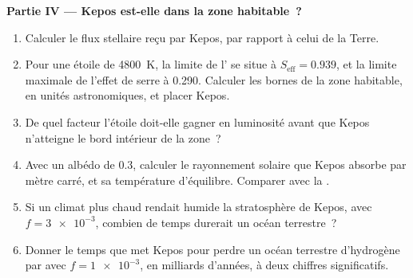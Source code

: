 \begin{problem}
\medskip\noindent\textbf{Partie IV --- Kepos est-elle dans la zone habitable~?}
\begin{enumerate}[resume]
\item Calculer le flux stellaire reçu par Kepos, par rapport à celui de la Terre.
\item Pour une étoile de \qty{4800}{K}, la limite de l' se situe à
  $S_\mathrm{eff} = 0.939$, et la limite maximale de l'effet de serre à 0.290. Calculer les
  bornes de la zone habitable, en unités astronomiques, et placer Kepos.
\item De quel facteur l'étoile doit-elle gagner en luminosité avant que Kepos n'atteigne
  le bord intérieur de la zone~?
\item Avec un albédo de 0.3, calculer le rayonnement solaire que Kepos absorbe par
  mètre carré, et sa température d'équilibre. Comparer avec la .
\item Si un climat plus chaud rendait humide la stratosphère de Kepos, avec
  $f = \num{3e-3}$, combien de temps durerait un océan terrestre~?
\item Donner le temps que met Kepos pour perdre un océan terrestre d'hydrogène par
   avec $f = \num{1e-3}$, en milliards d'années, à
  deux chiffres significatifs.
\end{enumerate}
\end{problem}
